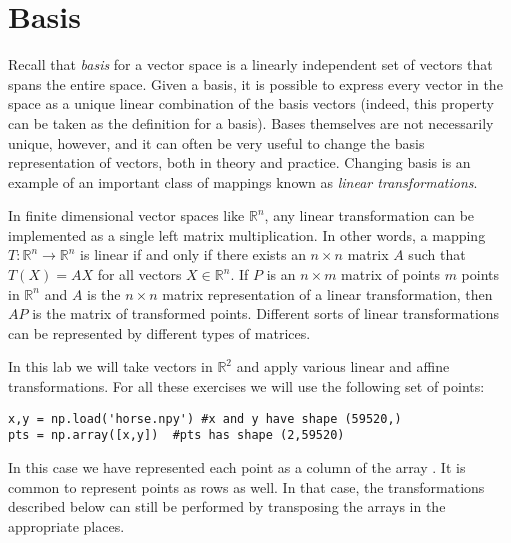 \label{lab:ChangeBasis}



\section*{Basis}

Recall that \emph{basis} for a vector space is a linearly independent set of vectors
that spans the entire space. Given a basis, it is possible to express
every vector in the space as a unique linear combination of the basis vectors
(indeed, this property can be taken as the definition for a basis).
Bases themselves are not necessarily unique, however, and it can often be
very useful to change the basis representation of vectors, both in theory and
practice. Changing basis is an example of an important class of mappings
known as \emph{linear transformations}.

In finite dimensional vector spaces like $\mathbb{R}^n$, any linear
transformation can be implemented as a single left matrix multiplication.
In other words, a mapping $T : \mathbb{R}^n \to \mathbb{R}^n$ is linear if and
only if there exists an $n \times n$ matrix $A$ such that $T\left(X\right) = AX$
for all vectors $X \in \mathbb{R}^n$.
If $P$ is an $n \times m$ matrix of points $m$ points in $\mathbb{R}^n$ and $A$
is the $n \times n$ matrix representation of a linear transformation, then $AP$
is the matrix of transformed points.
Different sorts of linear transformations can be represented by different types
of matrices.

In this lab we will take vectors in $\mathbb{R}^2$ and apply various linear and
affine transformations.
For all these exercises we will use the following set of points:
\begin{lstlisting}
x,y = np.load('horse.npy') #x and y have shape (59520,)
pts = np.array([x,y])  #pts has shape (2,59520)
\end{lstlisting}
In this case we have represented each point as a column of the array .
It is common to represent points as rows as well.
In that case, the transformations described below can still be performed by
transposing the arrays in the appropriate places.

